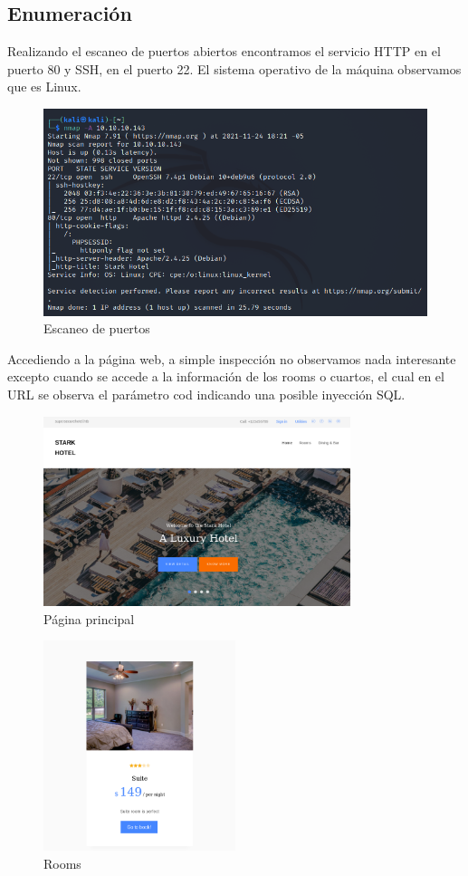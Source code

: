 \documentclass{article}
\begin{document}
\subsection{Enumeración}
Realizando el escaneo de puertos abiertos encontramos el servicio HTTP en el puerto 80 y SSH, en el puerto 22. El sistema operativo de la máquina observamos que es Linux.
\begin{figure}[H]
	\center
	\includegraphics[width=\textwidth]{images/jarvis/1.png}
	\caption{Escaneo de puertos}
\end{figure}

Accediendo a la página web, a simple inspección no observamos nada interesante excepto cuando se accede a la información de los rooms o cuartos, el cual en el URL se observa el parámetro cod indicando una posible inyección SQL.
\begin{figure}[H]
	\center
	\includegraphics[width=0.8\textwidth]{images/jarvis/2.png}
	\caption{Página principal}
\end{figure}
\begin{figure}[H]
	\center
	\includegraphics[width=0.5\textwidth]{images/jarvis/3.png}
	\caption{Rooms}
\end{figure}
\end{document}
